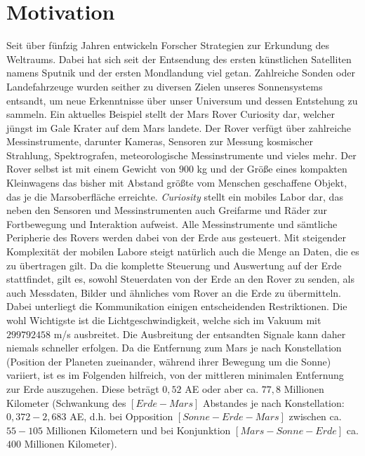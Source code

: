 \section{Motivation}

Seit {\"u}ber f{\"u}nfzig Jahren entwickeln Forscher Strategien
zur Erkundung des Weltraums. Dabei hat sich seit der Entsendung des ersten k{\"u}nstlichen
Satelliten namens Sputnik und der ersten Mondlandung viel getan.
Zahlreiche Sonden oder Landefahrzeuge wurden seither zu diversen Zielen unseres
Sonnensystems entsandt, um neue Erkenntnisse {\"u}ber unser Universum und dessen
Entstehung zu sammeln. Ein aktuelles Beispiel stellt der Mars Rover Curiosity
dar, welcher j{\"u}ngst im Gale Krater auf dem Mars landete. Der Rover
verf{\"u}gt {\"u}ber zahlreiche Messinstrumente, darunter Kameras, Sensoren zur
Messung kosmischer Strahlung, Spektrografen, meteorologische Messinstrumente und
vieles mehr. Der Rover selbst ist mit einem Gewicht von $900$ kg und der
Gr{\"o}{\ss}e eines kompakten Kleinwagens das bisher mit Abstand gr{\"o}{\ss}te
vom Menschen geschaffene Objekt, das je die Marsoberfl{\"a}che erreichte.
\textit{Curiosity} stellt ein mobiles Labor dar, das neben den Sensoren und
Messinstrumenten auch Greifarme und R{\"a}der zur Fortbewegung und Interaktion
aufweist. Alle Messinstrumente und s{\"a}mtliche Peripherie des Rovers werden dabei von der
Erde aus gesteuert. \newline
Mit steigender Komplexit{\"a}t der mobilen Labore
steigt nat{\"u}rlich auch die Menge an Daten, die es zu {\"u}bertragen gilt. Da
die komplette Steuerung und Auswertung auf der Erde stattfindet, gilt es, sowohl
Steuerdaten von der Erde an den Rover zu senden, als auch Messdaten, Bilder und
{\"a}hnliches vom Rover an die Erde zu {\"u}bermitteln. Dabei unterliegt die
Kommunikation einigen entscheidenden Restriktionen. Die wohl Wichtigste ist die
Lichtgeschwindigkeit, welche sich im Vakuum mit $299 792 458$ m/s ausbreitet.
Die Ausbreitung der entsandten Signale kann daher niemals schneller erfolgen. Da die
Entfernung zum Mars je nach Konstellation (Position der Planeten zueinander,
w{\"a}hrend ihrer Bewegung um die Sonne) variiert, ist es im Folgenden
hilfreich, von der mittleren minimalen Entfernung zur Erde auszugehen. Diese betr{\"a}gt $0,52$ AE oder aber ca. $77,8$ Millionen Kilometer (Schwankung des
$[Erde - Mars]$ Abstandes je nach Konstellation: $0,372 - 2,683$ AE, d.h. bei
Opposition $[Sonne - Erde - Mars]$ zwischen ca. $55 - 105$ Millionen Kilometern
und bei Konjunktion $[Mars - Sonne - Erde]$ ca. $400$ Millionen Kilometer).

